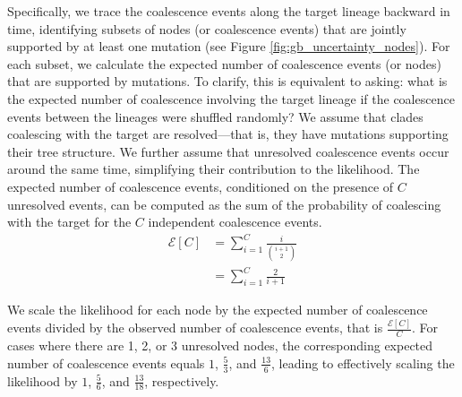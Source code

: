 Specifically, we trace the coalescence events along the target lineage backward in time, identifying subsets of nodes (or coalescence events) that are jointly supported by at least one mutation (see Figure \ref{fig:gb_uncertainty_nodes}). For each subset, we calculate the expected number of coalescence events (or nodes) that are supported by mutations. To clarify, this is equivalent to asking: what is the expected number of coalescence involving the target lineage if the coalescence events between the lineages were shuffled randomly? We assume that clades coalescing with the target are resolved—that is, they have mutations supporting their tree structure. We further assume that unresolved coalescence events occur around the same time, simplifying their contribution to the likelihood. The expected number of coalescence events, conditioned on the presence of $C$ unresolved events, can be computed as the sum of the probability of coalescing with the target for the $C$ independent coalescence events.
\begin{align}
    \mathcal{E}[C] &= \sum_{i=1}^{C} \frac{i}{\binom{i+1}{2}} \\
    &= \sum_{i=1}^{C} \frac{2}{i+1}
\end{align}

We scale the likelihood for each node by the expected number of coalescence events divided by the observed number of coalescence events, that is $\frac{\mathcal{E}[C]}{C}$. For cases where there are 1, 2, or 3 unresolved nodes, the corresponding expected number of coalescence events equals $1$, $\frac{5}{3}$, and $\frac{13}{6}$, leading to effectively scaling the likelihood by $1$, $\frac{5}{6}$, and $\frac{13}{18}$, respectively.


